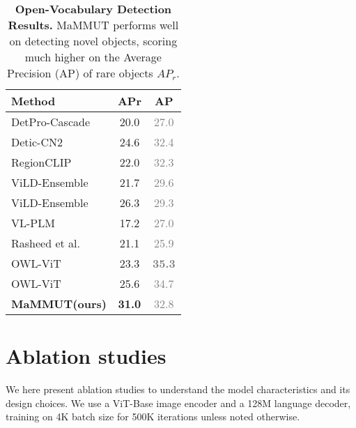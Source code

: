 \documentclass[10pt]{article} \usepackage[accepted]{tmlr}
\newcommand{\tablestyle}[2]{\setlength{\tabcolsep}{#1}\renewcommand{\arraystretch}{#2}\centering\footnotesize}
\newcommand{\gray}[1]{\textcolor{gray}{{#1}}}
\newcommand{\ours}{MaMMUT\xspace}
\begin{document}
\begin{table}[t]
\centering
\small
\tablestyle{8pt}{1.1}
\begin{tabular}{l|c|c}
Method	&APr &AP  \\
\hline
DetPro-Cascade~\citep{du2022learning}  & 20.0 &\gray{27.0}\\
Detic-CN2~\citep{zhou2022detecting} & 24.6 &\gray{32.4}\\
RegionCLIP~\citep{zhong2021regionclip} & 22.0 &\gray{32.3}\\
ViLD-Ensemble~\citep{gu2022openvocabulary} & 21.7 &\gray{29.6}\\
ViLD-Ensemble~\citep{gu2022openvocabulary} & 26.3 &\gray{29.3}\\
VL-PLM~\citep{zhao2022exploiting} & 17.2 &\gray{27.0}\\
Rasheed et al.~\citep{rasheed2022bridging} & 21.1 &\gray{25.9} \\
OWL-ViT~\citep{minderer2022simple} & 23.3 & \textbf{\gray{35.3}}\\
OWL-ViT~\citep{minderer2022simple} &25.6 &\gray{34.7}\\
\hline
\textbf{\ours (ours)} 	& \textbf{31.0} & \gray{32.8} \\ 
\hline
\end{tabular}
\vspace{2mm}
\caption{\textbf{Open-Vocabulary Detection Results.} \ours performs well on detecting novel objects, scoring much higher on the Average Precision (AP) of rare objects $AP_r$. 
}
\label{tab:ovd}
\vspace{-2mm}
\end{table}



\section{Ablation studies}
\label{sec:ablation}

We here present ablation studies  to understand the model characteristics and its design choices. We use a ViT-Base image encoder and a 128M language decoder, training on 4K batch size for 500K iterations unless noted otherwise.
\end{document}
